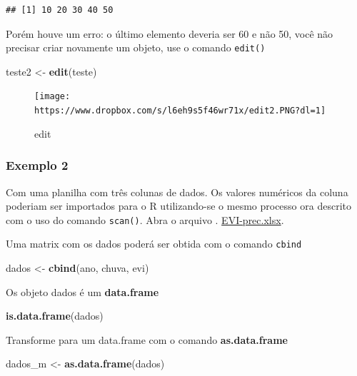 \documentclass[]{book}
\newenvironment{Shaded}{\begin{snugshade}}{\end{snugshade}}
\newcommand{\KeywordTok}[1]{\textcolor[rgb]{0.13,0.29,0.53}{\textbf{#1}}}
\newcommand{\NormalTok}[1]{#1}
\newcommand{\StringTok}[1]{\textcolor[rgb]{0.31,0.60,0.02}{#1}}
\begin{document}
\begin{verbatim}
## [1] 10 20 30 40 50
\end{verbatim}

Porém houve um erro: o último elemento deveria ser 60 e não 50, você não precisar criar novamente um objeto, use o comando \texttt{edit()}

\begin{Shaded}
\begin{Highlighting}[]
\NormalTok{teste2 <-}\StringTok{ }\KeywordTok{edit}\NormalTok{(teste)}
\end{Highlighting}
\end{Shaded}

\begin{figure}
\centering
\texttt{[image: https://www.dropbox.com/s/l6eh9s5f46wr71x/edit2.PNG?dl=1]}
\caption{edit}
\end{figure}

\hypertarget{exemplo-2}{%
\subsubsection{Exemplo 2}\label{exemplo-2}}

Com uma planilha com três colunas de dados. Os valores numéricos da coluna poderiam ser importados para o R utilizando-se o mesmo processo ora descrito com o uso do comando \texttt{scan()}. Abra o arquivo . \href{https://www.dropbox.com/s/6504oo4olw34dw9/EVI_Prec.xlsx?dl=1}{EVI-prec.xlsx}.

Uma matrix com os dados poderá ser obtida com o comando \texttt{cbind}

\begin{Shaded}
\begin{Highlighting}[]
\NormalTok{dados <-}\StringTok{ }\KeywordTok{cbind}\NormalTok{(ano, chuva, evi)}
\end{Highlighting}
\end{Shaded}

Os objeto dados é um \textbf{data.frame}

\begin{Shaded}
\begin{Highlighting}[]
\KeywordTok{is.data.frame}\NormalTok{(dados)}
\end{Highlighting}
\end{Shaded}

Transforme para um data.frame com o comando \textbf{as.data.frame}

\begin{Shaded}
\begin{Highlighting}[]
\NormalTok{dados_m <-}\StringTok{ }\KeywordTok{as.data.frame}\NormalTok{(dados)}
\end{Highlighting}
\end{Shaded}
\end{document}
